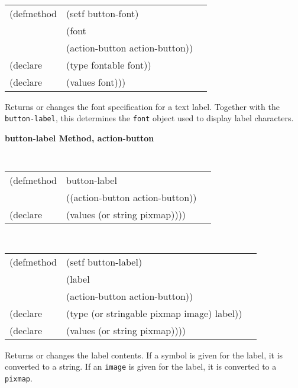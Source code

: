 \begin{flushright} \parbox[t]{6.125in}{
\tt
\begin{tabular}{lll}
\raggedright
(defmethod & (setf button-font) & \\
         & (font \\
         & (action-button  action-button)) \\
(declare &(type fontable  font))\\
(declare & (values font)))
\end{tabular}
\rm}
\end{flushright}

\begin{flushright} \parbox[t]{6.125in}{
Returns or changes the font specification for a text label. Together
with the {\tt button-label}, this determines the {\tt font}
object used to display label characters.
}
\end{flushright}




{\samepage  
{\large {\bf button-label \hfill Method, action-button}}
\begin{flushright} \parbox[t]{6.125in}{
\tt
\begin{tabular}{lll}
\raggedright
(defmethod & button-label & \\
& ((action-button  action-button)) \\
(declare & (values (or string pixmap))))
\end{tabular}
\rm

}\end{flushright}}

\begin{flushright} \parbox[t]{6.125in}{
\tt
\begin{tabular}{lll}
\raggedright
(defmethod & (setf button-label) & \\
         & (label \\
         & (action-button  action-button)) \\
(declare &(type (or stringable pixmap image)  label))\\
(declare & (values (or string pixmap))))
\end{tabular}
\rm}
\end{flushright}

\begin{flushright} \parbox[t]{6.125in}{
Returns or changes the label contents. If a symbol is given for the label, it is
converted to a string. If an {\tt image} is given for the label, it is converted
to a {\tt pixmap}.} \end{flushright}


